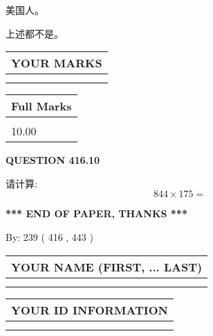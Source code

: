 \documentclass{ctexart}
\begin{document}
 
美国人。
 
 
 上述都不是。
 
 
  
\vspace{0.2in}
  
\noindent\begin{tabular}{|l|}
\hline
 YOUR MARKS  \\
\hline
 \\ 
 \\ 
\hline
\end{tabular}
\hspace{0.05in} \begin{tabular}{|l|}
\hline
 Full Marks  \\
\hline
 \\ 
10.00 \\
\hline
\end{tabular}
{\textbf{\Large{QUESTION
416.10 
}}}
  
  
 
请计算:
\begin{equation}
844  \times    %
175 = \nonumber
\end{equation}
 

 

 
   
   
 \vspace{0.2in}
 
   
   
   
   
\vspace{1.0in} 
{\textbf{\large{ *** END OF PAPER, THANKS *** }}} 
   
   
\hspace{1.0in} By: 
 239 ( 416 ,  443 )
   
   
   
   
\newpage 
\setcounter{page}{ 
   417001 } 
   
   
   
   
\noindent\begin{tabular}{|l|}
\hline
YOUR NAME (FIRST, ... LAST)  \\
\hline
 \\ 
 \\ 
\hline
\end{tabular}
\hspace{0.05in} \begin{tabular}{|l|}
\hline
 YOUR   ID   INFORMATION  \\
\hline
 \\ 
 \\ 
\hline
\end{tabular}
   
\end{document}
